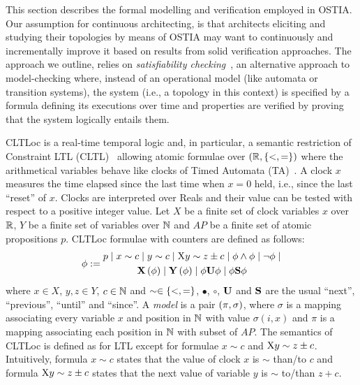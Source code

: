 This section describes the formal modelling and verification employed in OSTIA. Our assumption for continuous architecting, is that architects eliciting and studying their topologies by means of OSTIA may want to continuously and incrementally improve it based on results from solid verification approaches. The approach we outline, relies on \textit{satisfiability checking}~\cite{MPS13}, an alternative approach to model-checking where, instead of an operational model (like automata or transition systems), the system (i.e., a topology in this context) is specified by a formula defining its executions over time and properties are verified by proving that the system logically entails them.

CLTLoc is a real-time temporal logic and, in particular, a semantic restriction of Constraint LTL (CLTL)~\cite{DD07} allowing atomic formulae over $(\mathbb{R}, \{ <,= \})$ where the arithmetical variables behave like clocks of Timed Automata (TA)~\cite{timed}.
A clock $x$ measures the time elapsed since the last time when $x=0$ held, i.e., since the last ``reset'' of $x$.
Clocks are interpreted over Reals and their value can be tested with respect to a positive integer value.
%
Let $X$ be a finite set of clock variables $x$ over $\mathbb{R}$, $Y$ be a finite set of variables over $\mathbb{N}$ and $AP$ be a finite set of atomic propositions $p$.
CLTLoc formulae with counters are defined as follows:
\begin{equation*}%
  \phi :=
  \begin{gathered}
    p \mid x\sim c \mid y\sim c\mid \aX y\sim z\pm c \mid\phi \wedge \phi \mid \neg \phi \mid \\
       \X{\phi} \mid \Y{\phi} %
\mid \phi\U\phi \mid \phi\Snc\phi
  \end{gathered}
\end{equation*}
where $x \in X$, $y,z \in Y$, $c \in \mathbb{N}$ and 
$\sim \in \{ <,= \}$, $\bullet$, $\circ$, $\mathbf{U}$ and $\mathbf{S}$ are the
usual ``next'', ``previous'', ``until'' and ``since''.
A \textit{model} is a pair $(\pi, \sigma)$, where $\sigma$ is a mapping associating every variable $x$ and position in $\mathbb{N}$ with value $\sigma(i,x)$ and $\pi$ is a mapping associating each position in $\mathbb{N}$ with subset of $AP$. 
The semantics of CLTLoc is defined as for LTL except for formulae $x\sim c$ and $\mathrm{X} y \sim z\pm c$. 
Intuitively, formula $x\sim c$ states that the value of clock $x$ is $\sim$ than/to $c$ and formula $\mathrm{X} y \sim z\pm c$ states that the next value of variable $y$ is $\sim$ to/than $z+c$.

